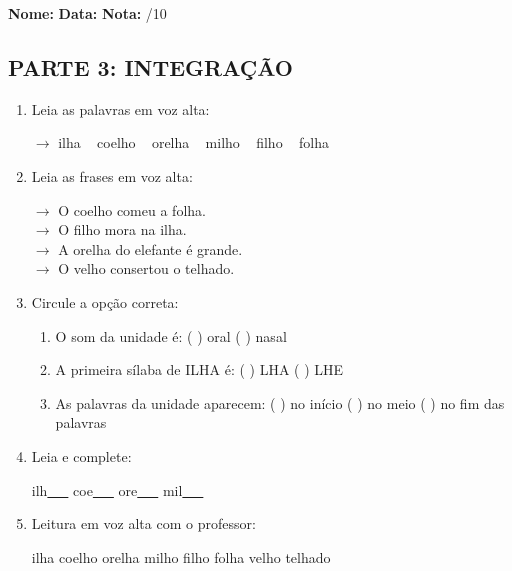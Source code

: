 \begin{exercicio}

\noindent\textbf{Nome:} \underline{\hspace{3.2cm}} \quad \textbf{Data:} \underline{\hspace{1.6cm}} \quad \textbf{Nota:} \underline{\hspace{0.9cm}}/10


\subsection*{PARTE 3: INTEGRAÇÃO}

\begin{enumerate}[resume]

  \item Leia as palavras em voz alta:
  \begin{center}
  $\rightarrow$ ilha ~ coelho ~ orelha ~ milho ~ filho ~ folha
  \end{center}

  \item Leia as frases em voz alta:
  \begin{center}
  $\rightarrow$ O coelho comeu a folha.\\
  $\rightarrow$ O filho mora na ilha.\\
  $\rightarrow$ A orelha do elefante é grande.\\
  $\rightarrow$ O velho consertou o telhado.\\
  \end{center}

  \item Circule a opção correta:
  \begin{enumerate}[label=(\alph*)]

    \item O som da unidade é: ( ) oral ( ) nasal 

    \item A primeira sílaba de ILHA é: ( ) LHA ( ) LHE

    \item As palavras da unidade aparecem: ( ) no início ( ) no meio ( ) no fim das palavras

  \end{enumerate}

  \item Leia e complete:
  \begin{center}
  ilh\underline{~~~} \quad coe\underline{~~~} \quad ore\underline{~~~} \quad mil\underline{~~~}
  \end{center}

  \item Leitura em voz alta com o professor:
  \begin{center}
  ilha \quad coelho \quad orelha \quad milho \quad filho \quad folha \quad velho \quad telhado
  \end{center}

\end{enumerate}

\end{exercicio}

